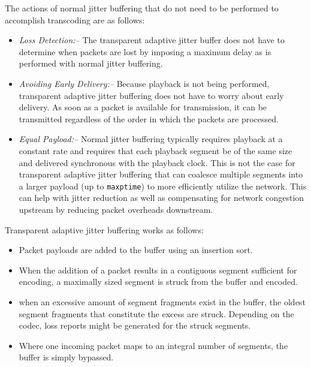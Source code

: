 \documentclass[letterpaper,final,notitlepage,twocolumn,10pt,twoside]{article}
\begin{document}
The actions of normal jitter buffering that do not need to be performed to
accomplish transcoding are as follows:

\begin{itemize}

\item{\it Loss Detection:--} The transparent adaptive jitter buffer does not
have to determine when packets are lost by imposing a maximum delay as is
performed with normal jitter buffering.

\item{\it Avoiding Early Delivery:--}  Because playback is not being performed,
transparent adaptive jitter buffering does not have to worry about early
delivery.  As soon as a packet is available for transmission, it can be
transmitted regardless of the order in which the packets are processed.

\item{\it Equal Payload:--}  Normal jitter buffering typically requires playback
at a constant rate and requires that each playback segment be of the same size
and delivered synchronous with the playback clock.  This is not the case for
transparent adaptive jitter buffering that can coalesce multiple segments into a
larger payload (up to {\tt maxptime}) to more efficiently utilize the network.
This can help with jitter reduction as well as compensating for network
congestion upstream by reducing packet overheads downstream.

\end{itemize}

Transparent adaptive jitter buffering works as follows:

\begin{itemize}

\item Packet payloads are added to the buffer using an insertion sort.

\item When the addition of a packet results in a contiguous segment sufficient
for encoding, a maximally sized segment is struck from the buffer and encoded.

\item when an excessive amount of segment fragments exist in the buffer, the
oldest segment fragments that constitute the excess are struck.  Depending on
the codec, loss reports might be generated for the struck segments.

\item Where one incoming packet maps to an integral number of segments, the
buffer is simply bypassed.

\end{itemize}
\end{document}
